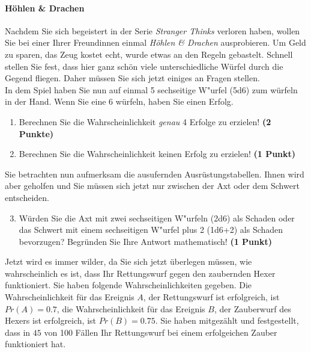 \documentclass[a4paper, 9pt]{scrartcl}\usepackage[]{graphicx}\usepackage[]{xcolor}
\begin{document}
\paragraph{H{\"o}hlen \& Drachen}



Nachdem Sie sich begeistert in der Serie \textit{Stranger Thinks} verloren
haben, wollen Sie bei einer Ihrer Freundinnen einmal \textit{H{\"o}hlen \& Drachen}
ausprobieren. Um Geld zu sparen, das Zeug kostet echt, wurde etwas an den
Regeln gebastelt. Schnell stellen Sie fest, dass hier ganz sch{\"o}n viele
unterschiedliche W{\"u}rfel durch die Gegend fliegen. Daher m{\"u}ssen Sie sich
jetzt einiges an Fragen stellen. \\%

In dem Spiel haben Sie nun auf einmal 5 sechseitige W{"u}rfel (5d6) zum w{\"u}rfeln in der Hand. Wenn Sie eine 6 w{\"u}rfeln,
haben Sie einen Erfolg.

\begin{enumerate}
\item Berechnen Sie die Wahrscheinlichkeit \textit{genau}
  4 Erfolge zu erzielen!  \textbf{(2 Punkte)}
\item Berechnen Sie die Wahrscheinlichkeit keinen Erfolg zu erzielen!
  \textbf{(1 Punkt)}
\end{enumerate}

Sie betrachten nun aufmerksam die ausufernden Ausr{\"u}stungstabellen. Ihnen
wird aber geholfen und Sie m{\"u}ssen sich jetzt nur zwischen der Axt oder dem
Schwert entscheiden.

\begin{enumerate}
  \setcounter{enumi}{2}
\item W{\"u}rden Sie die Axt mit zwei sechseitigen W{"u}rfeln (2d6) als Schaden oder
  das Schwert mit einem sechseitigen W{"u}rfel plus 2 (1d6+2) als Schaden bevorzugen?
  Begr{\"u}nden Sie Ihre Antwort mathematisch! \textbf{(1 Punkt)}
\end{enumerate}

Jetzt wird es immer wilder, da Sie sich jetzt {\"u}berlegen m{\"u}ssen, wie
wahrscheinlich es ist, dass Ihr Rettungswurf gegen den zaubernden Hexer
funktioniert. Sie haben folgende Wahrscheinlichkeiten gegeben. Die
Wahrscheinlichkeit f{\"u}r das Ereignis $A$, der Rettungswurf ist erfolgreich,
ist $Pr(A) = 0.7$, die Wahrscheinlichkeit f{\"u}r das Ereignis $B$,
der Zauberwurf des Hexers ist erfolgreich, ist $Pr(B) = 0.75$. Sie
haben mitgez{\"a}hlt und festgestellt, dass in $45$ von 100 F{\"a}llen
Ihr Rettungswurf bei einem erfolgeichen Zauber funktioniert hat.  
\end{document}
